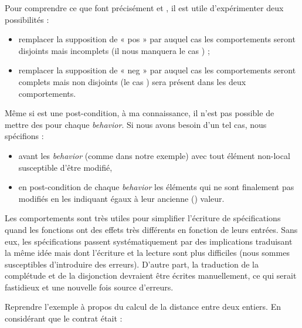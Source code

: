 Pour comprendre ce que font précisément  et , il est utile
d'expérimenter deux possibilités :



\begin{itemize}
\item remplacer la supposition de « pos » par  auquel cas les
comportements seront disjoints mais incomplets (il nous manquera le cas
) ;
\item remplacer la supposition de « neg » par  auquel cas les
comportements seront complets mais non disjoints (le cas ) sera
présent dans les deux comportements.
\end{itemize}


\begin{Warning}
Même si  est une post-condition, à ma connaissance, il n'est pas
possible de mettre des  pour chaque \textit{behavior}. Si nous avons
besoin d'un tel cas, nous spécifions :

\begin{itemize}
\item {} avant les \textit{behavior} (comme dans notre exemple) avec tout
élément non-local susceptible d'être modifié,
\item en post-condition de chaque \textit{behavior} les éléments qui ne sont finalement
pas modifiés en les indiquant égaux à leur ancienne () valeur.
\end{itemize}
\end{Warning}


Les comportements sont très utiles pour simplifier l'écriture de spécifications
quand les fonctions ont des effets très différents en fonction de leurs
entrées. Sans eux, les spécifications passent systématiquement par des
implications traduisant la même idée mais dont l'écriture et la lecture sont
plus difficiles (nous sommes susceptibles d'introduire des erreurs).
D'autre part, la traduction de la complétude et de la disjonction devraient
être écrites manuellement, ce qui serait fastidieux et une nouvelle fois source
d'erreurs.







Reprendre l'exemple à propos du calcul de la distance entre deux entiers.
En considérant que le contrat était :


